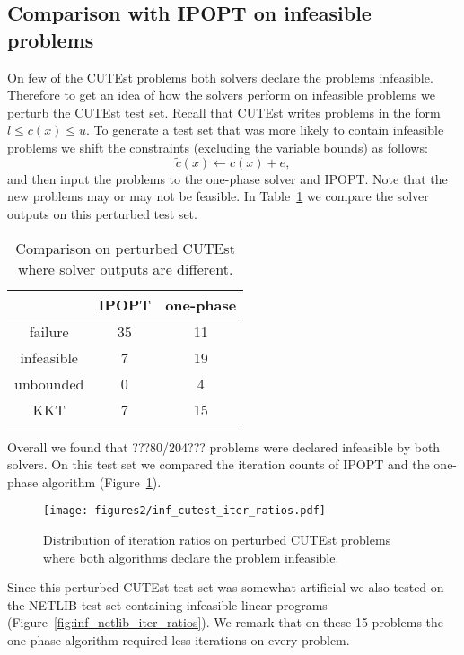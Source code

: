 \documentclass{article}
\begin{document}



\subsection{Comparison with IPOPT on infeasible problems}\label{sec:infeas}


On few of the CUTEst problems both solvers declare the problems infeasible. Therefore to get an idea of how the solvers perform on infeasible problems we perturb the CUTEst test set. Recall that CUTEst writes problems in the form $l \le c(x) \le u$. To generate a test set that was more likely to contain infeasible problems we shift the constraints (excluding the variable bounds) as follows:
$$
\tilde{c}(x) \gets c(x) + e,
$$
and then input the problems to the one-phase solver and IPOPT. Note that the new problems may or may not be feasible. In Table~\ref{table-perturbed-solver-output} we compare the solver outputs on this perturbed test set. 

\begin{table}[H]
\caption{Comparison on perturbed CUTEst where solver outputs are different.}\label{table-perturbed-solver-output}
\begin{tabular}{| c | c | c |}
& IPOPT & one-phase \\
\hline
failure &  35 & 11 \\ 
infeasible & 7 & 19 \\  
unbounded & 0 & 4 \\
KKT & 7 & 15 
\end{tabular}
\end{table}

Overall we found that ???80/204??? problems were declared infeasible by both solvers. On this test set we compared the iteration counts of IPOPT and the one-phase algorithm (Figure~\ref{fig:inf_cutest_iter_ratios}). 

\begin{figure}[H]
\texttt{[image: figures2/inf\_cutest\_iter\_ratios.pdf]}
\caption{Distribution of iteration ratios on perturbed CUTEst problems where both algorithms declare the problem infeasible.}\label{fig:inf_cutest_iter_ratios}
\end{figure}

Since this perturbed CUTEst test set was somewhat artificial we also tested on the NETLIB test set containing infeasible linear programs (Figure~\ref{fig:inf_netlib_iter_ratios}). We remark that on these 15 problems the one-phase algorithm required less iterations on every problem.
\end{document}
